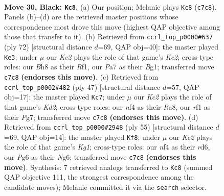\documentclass[11pt]{article}
\begin{document}
\clearpage

\begin{figure}[p]\centering
\begin{subfigure}{0.46\textwidth}\centering
\resizebox{\linewidth}{!}{%
\newchessgame
\chessboard[
  setfen={rr4nb/p1k2p1p/P1p3p1/2P5/4PN1P/8/5B2/3R1RK1 b - - 0 30},
  showmover=false,
  pgfstyle=straightmove, color=movearrow, markmove={c7-c8}
]}
\caption{}
\end{subfigure}\hfill
\begin{subfigure}{0.46\textwidth}\centering
\resizebox{\linewidth}{!}{%
\newchessgame
\chessboard[
  setfen={1k1r4/1bb2p2/7p/4pP1r/2N3p1/1P4P1/P1R1K2P/5RB1 w - - 1 37},
  showmover=false,
  pgfstyle=straightmove, color=movearrow, markmove={e2-e3}
]}
\caption{}
\end{subfigure}
\\[4pt]
\begin{subfigure}{0.46\textwidth}\centering
\resizebox{\linewidth}{!}{%
\newchessgame
\chessboard[
  setfen={r6r/1p1k1pp1/1bp1p3/4P2p/2P2P1P/2PB2P1/4K3/R2R4 b - - 1 24},
  showmover=false,
  pgfstyle=straightmove, color=movearrow, markmove={d7-c7}
]}
\caption{}
\end{subfigure}\hfill
\begin{subfigure}{0.46\textwidth}\centering
\resizebox{\linewidth}{!}{%
\newchessgame
\chessboard[
  setfen={r3r1k1/5pp1/3R2n1/8/pp6/8/PPP4P/2KR1B2 b - - 0 28},
  showmover=false,
  pgfstyle=straightmove, color=movearrow, markmove={g8-f8}
]}
\caption{}
\end{subfigure}
\caption{\textbf{Move 30, Black: \texttt{Kc8}.} (a) Our position; Melanie plays \texttt{Kc8} (\texttt{c7c8}). Panels (b)--(d) are the retrieved master positions whose correspondence most drove this move (highest QAP objective among those that transfer to it). (b) Retrieved from \texttt{ccrl\_top\_p0000\#637} (ply 72) [structural distance $d$=69, QAP obj=40]: the master played \texttt{Ke3}; under $\mu$ our \emph{Kc2} plays the role of that game's \emph{Ke2}; cross-type roles: our \emph{B}h8 as their \emph{R}f1, our \emph{P}a7 as their \emph{B}g1; transferred move \texttt{c7c8} \textbf{(endorses this move)}. (c) Retrieved from \texttt{ccrl\_top\_p0002\#482} (ply 47) [structural distance $d$=57, QAP obj=17]: the master played \texttt{Kc7}; under $\mu$ our \emph{Kc2} plays the role of that game's \emph{Kd2}; cross-type roles: our \emph{n}f4 as their \emph{R}a8, our \emph{r}f1 as their \emph{P}g7; transferred move \texttt{c7c8} \textbf{(endorses this move)}. (d) Retrieved from \texttt{ccrl\_top\_p0000\#2948} (ply 55) [structural distance $d$=69, QAP obj=14]: the master played \texttt{Kf8}; under $\mu$ our \emph{Kc2} plays the role of that game's \emph{Kg1}; cross-type roles: our \emph{n}f4 as their \emph{r}d6, our \emph{P}g6 as their \emph{N}g6; transferred move \texttt{c7c8} \textbf{(endorses this move)}. Synthesis: 7 retrieved analogs transferred to \texttt{Kc8} (summed QAP objective 111, the strongest correspondence among the candidate moves); Melanie committed it via the \texttt{search} selector.}
\label{fig:thought-m59}
\end{figure}
\end{document}
